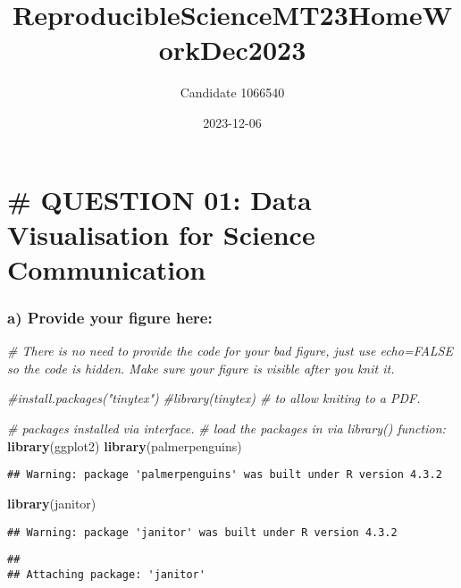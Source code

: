\documentclass[
]{article}
\title{ReproducibleScienceMT23HomeWorkDec2023}
\author{Candidate 1066540}
\date{2023-12-06}
\newenvironment{Shaded}{\begin{snugshade}}{\end{snugshade}}
\newcommand{\CommentTok}[1]{\textcolor[rgb]{0.56,0.35,0.01}{\textit{#1}}}
\newcommand{\FunctionTok}[1]{\textcolor[rgb]{0.13,0.29,0.53}{\textbf{#1}}}
\newcommand{\NormalTok}[1]{#1}
\begin{document}
\maketitle

\hypertarget{question-01-data-visualisation-for-science-communication}{%
\section{\# QUESTION 01: Data Visualisation for Science
Communication}\label{question-01-data-visualisation-for-science-communication}}

\hypertarget{a-provide-your-figure-here}{%
\subsubsection{a) Provide your figure
here:}\label{a-provide-your-figure-here}}

\begin{Shaded}
\begin{Highlighting}[]
\CommentTok{\# There is no need to provide the code for your bad figure, just use echo=FALSE so the code is hidden. Make sure your figure is visible after you knit it.}

\CommentTok{\#install.packages("tinytex")}
\CommentTok{\#library(tinytex) \# to allow kniting to a PDF.}

\CommentTok{\# packages installed via interface.}
\CommentTok{\# load the packages in via library() function:}
\FunctionTok{library}\NormalTok{(ggplot2)}
\FunctionTok{library}\NormalTok{(palmerpenguins)}
\end{Highlighting}
\end{Shaded}

\begin{verbatim}
## Warning: package 'palmerpenguins' was built under R version 4.3.2
\end{verbatim}

\begin{Shaded}
\begin{Highlighting}[]
\FunctionTok{library}\NormalTok{(janitor)}
\end{Highlighting}
\end{Shaded}

\begin{verbatim}
## Warning: package 'janitor' was built under R version 4.3.2
\end{verbatim}

\begin{verbatim}
## 
## Attaching package: 'janitor'
\end{verbatim}
\end{document}
